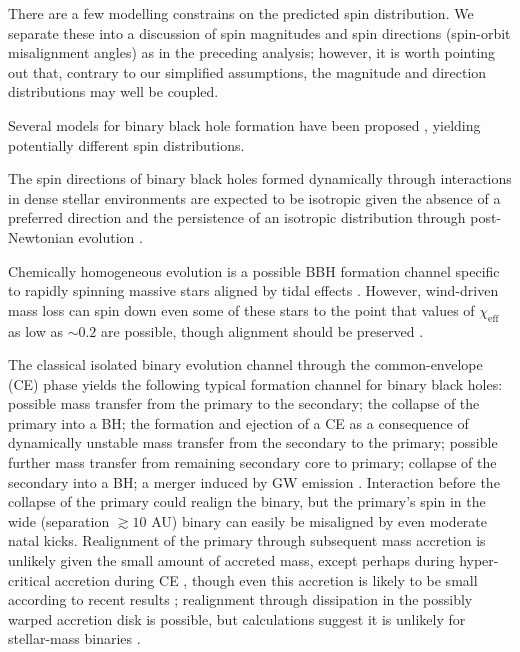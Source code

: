 \documentclass[modern,linenumbers]{aastex61}
\begin{document}
There are a few modelling constrains on the predicted spin
distribution.  We separate these into a discussion of spin magnitudes
and spin directions (spin-orbit misalignment angles) as in the
preceding analysis; however, it is worth pointing out that, contrary
to our simplified assumptions, the magnitude and direction
distributions may well be coupled.

Several models for binary black hole formation have been proposed
\citep[e.g.,][]{2016ApJ...818L..22A}, yielding potentially different spin
distributions.

The spin directions of binary black holes formed dynamically through
interactions in dense stellar environments \citep{SigurdssonHernquist:1993,PZMcMillan:2000,Rodriguez:2015,Stone:2016} 
are expected to be isotropic given the absence
of a preferred direction \citep[e.g.,][]{2016ApJ...832L...2R} and the
persistence of an isotropic distribution through post-Newtonian
evolution \citep{2004PhRvD..70l4020S}.

Chemically homogeneous evolution is a possible BBH formation channel
specific to rapidly spinning massive stars aligned by tidal effects
\citep{MandeldeMink:2016,Marchant:2016}.  However, wind-driven
mass loss can spin down even some of these stars to the point that
values of $\chi_\textrm{eff}$ as low as $\sim 0.2$ are possible,
though alignment should be preserved \citep{Marchant:2016}.

The classical isolated binary evolution channel \citep{TutukovYungelson:1973,TutukovYungelson:1993,Lipunov:1997,Dominik:2015} through the
common-envelope (CE) phase \citep{Ivanova:2013} 
yields the following typical formation channel for
binary black holes: possible mass transfer from the primary to the
secondary; the collapse of the primary into a BH; the formation and
ejection of a CE as a consequence of dynamically unstable mass
transfer from the secondary to the primary; possible further mass
transfer from remaining secondary core to primary; collapse of the
secondary into a BH; a merger induced by GW emission
\citep[e.g.,][]{2016Natur.534..512B,Stevenson:2017}.  Interaction
before the collapse of the primary could realign the binary, but the
primary's spin in the wide (separation $\gtrsim 10$ AU) binary can
easily be misaligned by even moderate \citep{Mandel:2015kicks}
natal kicks.  Realignment of the primary through subsequent mass
accretion is unlikely given the small amount of accreted mass, except
perhaps during hyper-critical accretion during CE \citep{2005ApJ...632.1035O}, though even this accretion is likely to be small according to recent results \citep{MacLeodRamirezRuiz:2015}; realignment through dissipation in the possibly warped
accretion disk \citep{1975ApJ...195L..65B} is possible, but calculations
suggest it is unlikely for stellar-mass binaries \citep{KLOP}.
\end{document}
